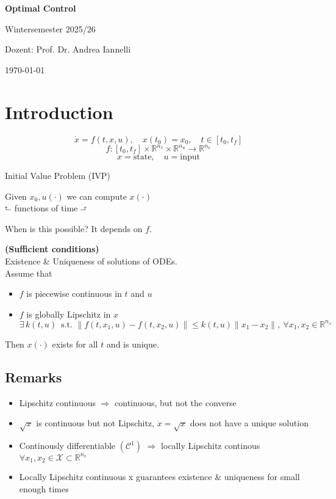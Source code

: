 \documentclass[12pt,a4paper,oneside]{scrartcl}
\newenvironment{lemmabox}[1][]{
	\refstepcounter{lemma}
	\begin{tcolorbox}[colback=blue!5!white,
		colframe=blue!60!black,
		fonttitle=\bfseries,
		boxrule=0.8pt,
		arc=3pt,
		left=8pt,right=8pt,top=6pt,bottom=6pt,
		title={Lemma \thelemma},
		#1]
		}{
	\end{tcolorbox}
}
\begin{document}
	
	\begin{titlepage}
		\centering
		\vspace*{3cm}
		{\Huge\bfseries Optimal Control}\par
		\vspace{1.5cm}
		{\Large Wintersemester 2025/26}\par
		\vspace{0.5cm}
		{\Large Dozent: Prof. Dr. Andrea Iannelli}\par
		\vfill
		{\today}
	\end{titlepage}
	
	\tableofcontents
	\clearpage
	
	\section{Introduction}
	\[
	\dot{x} = f(t,x,u), \quad x(t_0)=x_0, \quad t \in [t_0,t_f]
	\]
	\[
	f : [t_0,t_f]\times\mathbb{R}^{n_x}\times\mathbb{R}^{n_u} \to \mathbb{R}^{n_x}
	\]
	\[
	x = \text{state}, \quad u = \text{input}
	\]
	
	Initial Value Problem (IVP)
	
	Given $x_0, u(\cdot)$ we can compute $x(\cdot)$ \\
	\hspace*{23.5mm}$\rotatebox[origin=c]{90}{$\Rsh$}$ functions of time $\rotatebox[origin=c]{270}{$\Lsh$}$
	
	When is this possible? It depends on $f$.
	
	
	\begin{lemmabox}
		\textbf{(Sufficient conditions)}\\
		Existence \& Uniqueness of solutions of ODEs.\\
		Assume that
		\begin{itemize}[]
			\item $f$ is piecewise continuous in $t$ and $u$
			\item $f$ is globally Lipschitz in $x$
			\[
			\exists\, k(t,u)\, \text{ s.t. } \|f(t,x_1,u)-f(t,x_2,u)\|\le k(t,u)\|x_1-x_2\|,\ \forall x_1,x_2 \in \mathbb{R}^{n_x}
			\]
		\end{itemize}
		Then $x(\cdot)$ exists for all $t$ and is unique.
	\end{lemmabox}
	
	\subsection*{Remarks}
	\begin{itemize}[noitemsep]
		\item Lipschitz continuous $\Rightarrow$ continuous, but not the converse
		\item $\sqrt{x}$ is continuous but not Lipschitz, $\dot x = \sqrt{x}$ does not have a unique solution
		\item Continously differentiable $(\mathcal{C}^1)$ $\Rightarrow$ locally Lipschitz continous $\forall x_1,x_2 \in \mathcal{X} \subset \mathbb{R}^{n_x}$
		\item Locally Lipschitz continuous x guarantees existence \& uniqueness for small enough times
	\end{itemize}
	
\end{document}
